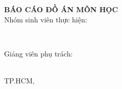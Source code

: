 
\begin{minipage}{1.0\textwidth} \centering
    {\UNIVERSITY}\\
    {\UPMCentre}\\
\end{minipage}

\vspace{15 mm}

\begin{center}
\vspace{10 mm}

\begin{spacing}{2.0}
\textbf{\LARGE {\thesisTitle}}
\end{spacing}

\vspace{15 mm}

\begin{spacing}{1.3}
\textbf{\LARGE {BÁO CÁO ĐỒ ÁN MÔN HỌC}}\\
\medskip
{\large {Nhóm sinh viên thực hiện:}}
\end{spacing}
\end{center}


\begin{center}
\begin{spacing}{1.3}
\textbf{\large {\thesisAuthor}}\\
\end{spacing}
\end{center}

\vspace{5 mm}
\begin{center}
\begin{spacing}{1.3}
{Giảng viên phụ trách:}\\
    {\large {\supervisor}}\\
    {\large {\cosupervisor}}
\end{spacing}
\end{center}

\vspace{30 mm}
\begin{center}
    \large {TP.HCM, \thesisDate}
\end{center}

